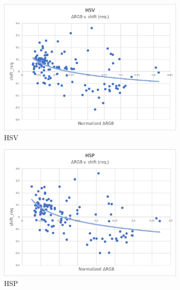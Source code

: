 \begin{figure}
\centering
\begin{subfigure}{.49\linewidth}
  \includegraphics[width=1\linewidth]{figures/model/scatter/model_hsv.jpg}
  \caption{HSV}
\end{subfigure}
\hfill
\begin{subfigure}{.49\linewidth}
  \includegraphics[width=1\linewidth]{figures/model/scatter/model_hsp.jpg}
  \caption{HSP}
\end{subfigure}
\hfill
\begin{subfigure}{.49\linewidth}

\end{subfigure}
\end{figure}

